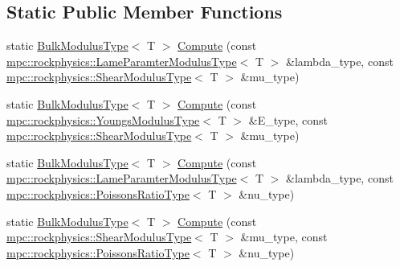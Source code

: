 \subsection*{Static Public Member Functions}
\begin{DoxyCompactItemize}
\item 
static \mbox{\hyperlink{structmpc_1_1rockphysics_1_1_bulk_modulus_type}{Bulk\+Modulus\+Type}}$<$ T $>$ \mbox{\hyperlink{structmpc_1_1rockphysics_1_1_rock_physics_transforms_3_01_t_00_01mpc_1_1rockphysics_1_1_bulk_modulus_type_3_01_t_01_4_01_4_addbfab4e83b3b5c535da97e0ca9f9fd3}{Compute}} (const \mbox{\hyperlink{structmpc_1_1rockphysics_1_1_lame_paramter_modulus_type}{mpc\+::rockphysics\+::\+Lame\+Paramter\+Modulus\+Type}}$<$ T $>$ \&lambda\+\_\+type, const \mbox{\hyperlink{structmpc_1_1rockphysics_1_1_shear_modulus_type}{mpc\+::rockphysics\+::\+Shear\+Modulus\+Type}}$<$ T $>$ \&mu\+\_\+type)
\item 
static \mbox{\hyperlink{structmpc_1_1rockphysics_1_1_bulk_modulus_type}{Bulk\+Modulus\+Type}}$<$ T $>$ \mbox{\hyperlink{structmpc_1_1rockphysics_1_1_rock_physics_transforms_3_01_t_00_01mpc_1_1rockphysics_1_1_bulk_modulus_type_3_01_t_01_4_01_4_aa196a54cfae8a69ddb309f4fab0e8fa3}{Compute}} (const \mbox{\hyperlink{structmpc_1_1rockphysics_1_1_youngs_modulus_type}{mpc\+::rockphysics\+::\+Youngs\+Modulus\+Type}}$<$ T $>$ \&E\+\_\+type, const \mbox{\hyperlink{structmpc_1_1rockphysics_1_1_shear_modulus_type}{mpc\+::rockphysics\+::\+Shear\+Modulus\+Type}}$<$ T $>$ \&mu\+\_\+type)
\item 
static \mbox{\hyperlink{structmpc_1_1rockphysics_1_1_bulk_modulus_type}{Bulk\+Modulus\+Type}}$<$ T $>$ \mbox{\hyperlink{structmpc_1_1rockphysics_1_1_rock_physics_transforms_3_01_t_00_01mpc_1_1rockphysics_1_1_bulk_modulus_type_3_01_t_01_4_01_4_acf31ebaab50b8f02d7c3da3a79b259c4}{Compute}} (const \mbox{\hyperlink{structmpc_1_1rockphysics_1_1_lame_paramter_modulus_type}{mpc\+::rockphysics\+::\+Lame\+Paramter\+Modulus\+Type}}$<$ T $>$ \&lambda\+\_\+type, const \mbox{\hyperlink{structmpc_1_1rockphysics_1_1_poissons_ratio_type}{mpc\+::rockphysics\+::\+Poissons\+Ratio\+Type}}$<$ T $>$ \&nu\+\_\+type)
\item 
static \mbox{\hyperlink{structmpc_1_1rockphysics_1_1_bulk_modulus_type}{Bulk\+Modulus\+Type}}$<$ T $>$ \mbox{\hyperlink{structmpc_1_1rockphysics_1_1_rock_physics_transforms_3_01_t_00_01mpc_1_1rockphysics_1_1_bulk_modulus_type_3_01_t_01_4_01_4_a00fc599b2bb932d0ea34ff4856b14263}{Compute}} (const \mbox{\hyperlink{structmpc_1_1rockphysics_1_1_shear_modulus_type}{mpc\+::rockphysics\+::\+Shear\+Modulus\+Type}}$<$ T $>$ \&mu\+\_\+type, const \mbox{\hyperlink{structmpc_1_1rockphysics_1_1_poissons_ratio_type}{mpc\+::rockphysics\+::\+Poissons\+Ratio\+Type}}$<$ T $>$ \&nu\+\_\+type)

\end{DoxyCompactItemize}
